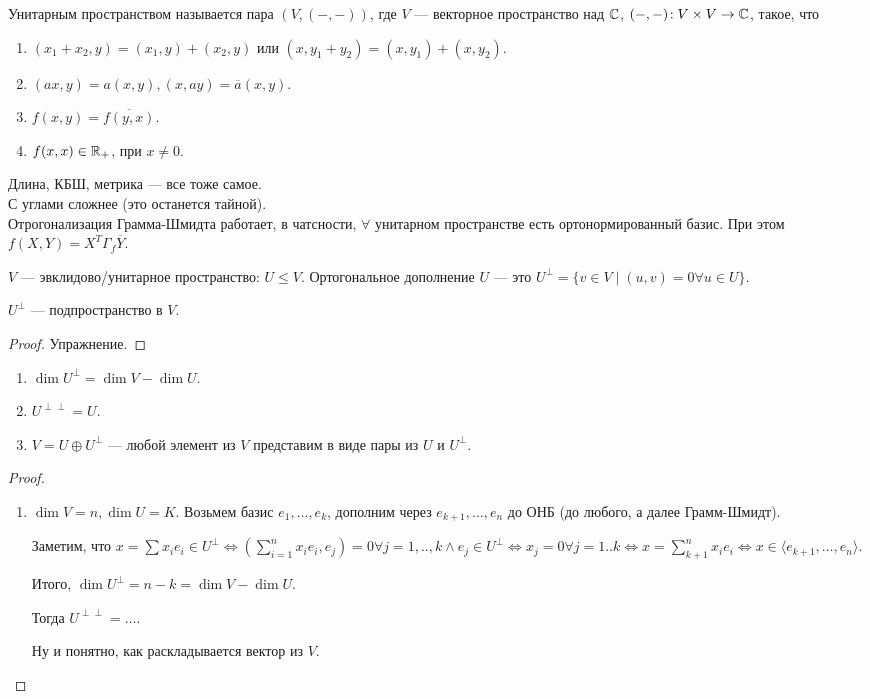 \begin{definition}
    Унитарным пространством называется пара $(V, (-,-))$, где  $V$ --- векторное пространство над  $\mathbb{C}$,  $(-, -)\!: V \times V \to \mathbb{C}$, такое, что 
     \begin{enumerate}
     \item $(x_1 + x_2, y) = (x_1, y) + (x_2, y)$ или $(x, y_1 + y_2) = (x, y_1) + (x, y_2)$.
     \item $(ax, y) = a(x, y), (x, ay) = \overline{a}(x, y)$.
     \item $f(x, y) = \overline{f(y, x)}$.
     \item  $f(x, x) \in \mathbb{R}_+$, при  $x \neq 0$.
    \end{enumerate}
    Длина, КБШ, метрика --- все тоже самое.
\\
    С углами сложнее (это останется тайной).
    \\
    Отрогонализация Грамма-Шмидта работает, в чатсности, $\forall$ унитарном пространстве есть ортонормированный базис. При этом $f(X, Y) = X^T\Gamma_f\overline{Y}$.
\end{definition}
 \begin{definition}
     $V$ --- эвклидово/унитарное пространство:  $U \le V$. Ортогональное дополнение $U$ --- это $U^\perp = \{ v \in V \mid (u,v) = 0 \forall u \in U\}$.
 \end{definition}
 \begin{statement}
     $U^\perp$ --- подпространство в  $V$.
 \end{statement}
 \begin{proof}
     Упражнение.
 \end{proof}
 \begin{theorem}
     \slashn
      \begin{enumerate}
          \item $\dim U^\perp = \dim V - \dim U$.
          \item  $U^{\perp\perp} = U$.
          \item  $V = U \oplus U^\perp$ --- любой элемент из $V$ представим в виде пары из  $U$ и  $U^\perp$.
     \end{enumerate}
 \end{theorem}
 \begin{proof}
     \slashn
     \begin{enumerate}
         \item $\dim V = n, \dim U = K$. Возьмем базис $e_1, \ldots, e_k$, дополним через $e_{k+1}, \ldots, e_n$ до ОНБ (до любого, а далее Грамм-Шмидт).

             Заметим, что $x = \sum x_ie_i \in U^{\perp} \iff (\sum\limits_{i=1}^n x_ie_i, e_j) = 0 \forall j=1,..,k \land e_j \in U^{\perp} \iff x_j = 0 \forall j=1..k \iff x = \sum\limits_{k+1}^n x_ie_i \iff x \in \langle e_{k+1}, \ldots, e_n \rangle$.

            Итого, $\dim U^\perp = n - k = \dim V - \dim U$.

            Тогда  $U^{\perp\perp} = \ldots$. 

            Ну и понятно, как раскладывается вектор из $V$.
     \end{enumerate}
 \end{proof}
